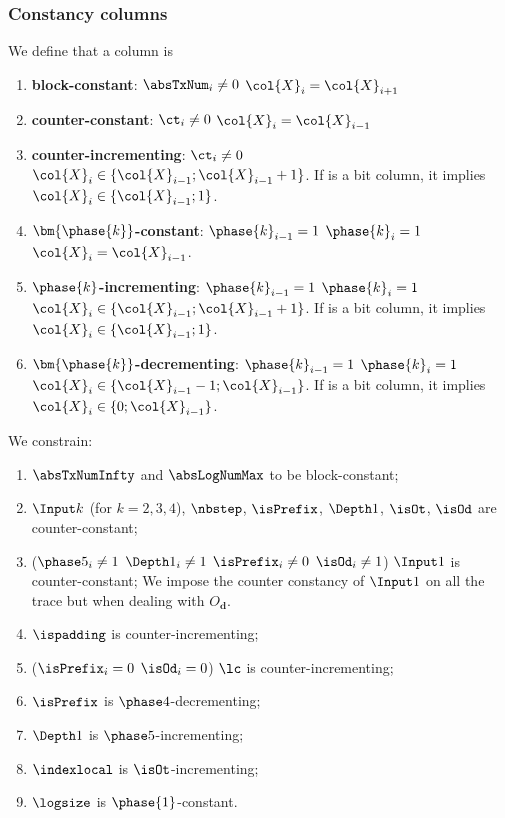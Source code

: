 \subsubsection{Constancy columns} \label{constancy_constraints}
We define that a column  is
\begin{enumerate}
    \item \textbf{block-constant}: \If $\absTxNum_{i} \neq 0$ \Then $\col{X}_{i}=\col{X}_{i+1}$
    \item \textbf{counter-constant}: \If $\ct_{i} \neq 0$ \Then $\col{X}_{i}=\col{X}_{i-1}$
    \item \textbf{counter-incrementing}: \If $\ct_{i} \neq 0$ \Then $\col{X}_{i} \in \{\col{X}_{i-1}; \col{X}_{i-1} +1 \}$. If  is a bit column, it implies $\col{X}_{i} \in \{\col{X}_{i-1}; 1 \}$.
    \item \textbf{$\bm{\phase{k}}$-constant}: \If $\phase{k}_{i-1} = 1$ \et $\phase{k}_{i}=1$ \Then $\col{X}_{i}=\col{X}_{i-1}$.
    \item \textbf{$\phase{k}$-incrementing}: \If $\phase{k}_{i-1} = 1$ \et $\phase{k}_{i}=1$ \Then $\col{X}_{i} \in \{\col{X}_{i-1}; \col{X}_{i-1} +1 \}$. If  is a bit column, it implies $\col{X}_{i} \in \{\col{X}_{i-1}; 1 \}$.
    \item \textbf{$\bm{\phase{k}}$-decrementing}: \If $\phase{k}_{i-1} = 1$ \et $\phase{k}_{i}=1$ \Then $\col{X}_{i} \in \{\col{X}_{i-1} -1; \col{X}_{i-1} \}$. If  is a bit column, it implies $\col{X}_{i} \in \{0 ; \col{X}_{i-1}\}$.
\end{enumerate}

We constrain:
\begin{enumerate}
    \item $\absTxNumInfty$ and $\absLogNumMax$ to be block-constant;
    \item $\Input k$ (for $k= 2, 3, 4$), $\nbstep$, $\isPrefix$, $\Depth 1$, $\isOt$, $\isOd$  are counter-constant;
    \item \If ($\phase 5_{i} \neq 1$ \Or $\Depth1_{i} \neq 1$ \Or $\isPrefix_{i} \neq 0$ \Or $\isOd_{i} \neq 1$) \Then $\Input 1$ is counter-constant;
    \saNote{} We impose the counter constancy of $\Input 1$ on all the trace but when dealing with $O_{\textbf{d}}$.

    \item $\ispadding$ is counter-incrementing;
    \item \If ($\isPrefix_{i}=0$ \Or $\isOd_{i}=0$) \Then $\lc$ is counter-incrementing;
    \item $\isPrefix$ is $\phase 4$-decrementing;
    \item $\Depth 1$ is $\phase 5$-incrementing;
    \item $\indexlocal$ is $\isOt$-incrementing;
    \item $\logsize$ is $\phase{1}$-constant.
\end{enumerate}

